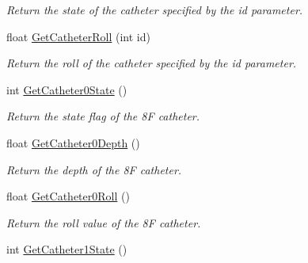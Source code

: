 \begin{DoxyCompactItemize}
\begin{DoxyCompactList}\small\item\em Return the state of the catheter specified by the id parameter. \item\end{DoxyCompactList}\item 
\hypertarget{classvtkVSP_af4dcfbcd86f249c6ef503ac3ddd8e726}{
float \hyperlink{classvtkVSP_af4dcfbcd86f249c6ef503ac3ddd8e726}{GetCatheterRoll} (int id)}
\label{classvtkVSP_af4dcfbcd86f249c6ef503ac3ddd8e726}

\begin{DoxyCompactList}\small\item\em Return the roll of the catheter specified by the id parameter. \item\end{DoxyCompactList}\item 
\hypertarget{classvtkVSP_a273686a9916cd9ee186eaba47f5c6821}{
int \hyperlink{classvtkVSP_a273686a9916cd9ee186eaba47f5c6821}{GetCatheter0State} ()}
\label{classvtkVSP_a273686a9916cd9ee186eaba47f5c6821}

\begin{DoxyCompactList}\small\item\em Return the state flag of the 8F catheter. \item\end{DoxyCompactList}\item 
\hypertarget{classvtkVSP_ac8f05fd20cd3e3a46d7905b8a74047a4}{
float \hyperlink{classvtkVSP_ac8f05fd20cd3e3a46d7905b8a74047a4}{GetCatheter0Depth} ()}
\label{classvtkVSP_ac8f05fd20cd3e3a46d7905b8a74047a4}

\begin{DoxyCompactList}\small\item\em Return the depth of the 8F catheter. \item\end{DoxyCompactList}\item 
\hypertarget{classvtkVSP_a25bd4f1453fed3313fd6311b7d59be98}{
float \hyperlink{classvtkVSP_a25bd4f1453fed3313fd6311b7d59be98}{GetCatheter0Roll} ()}
\label{classvtkVSP_a25bd4f1453fed3313fd6311b7d59be98}

\begin{DoxyCompactList}\small\item\em Return the roll value of the 8F catheter. \item\end{DoxyCompactList}\item 
\hypertarget{classvtkVSP_a60c7a368b17b23ddc9e8899211318d1e}{
int \hyperlink{classvtkVSP_a60c7a368b17b23ddc9e8899211318d1e}{GetCatheter1State} ()}
\label{classvtkVSP_a60c7a368b17b23ddc9e8899211318d1e}


\end{DoxyCompactItemize}
